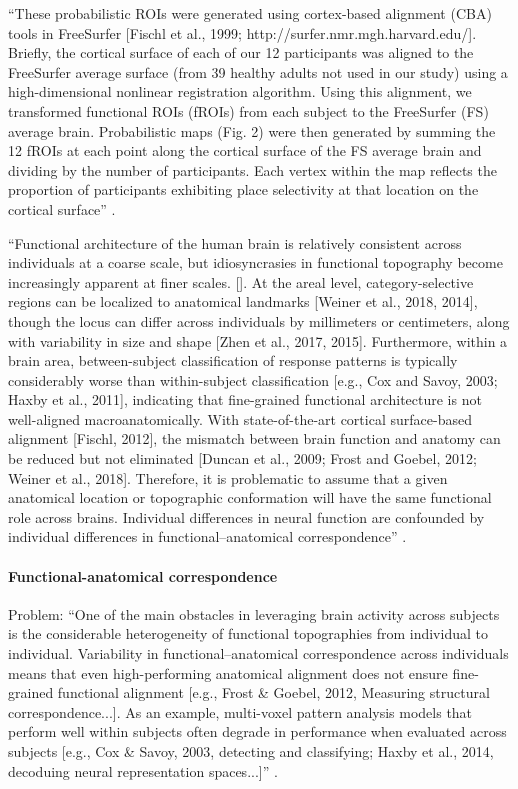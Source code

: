 %
``These probabilistic ROIs were generated using cortex-based alignment (CBA)
tools in FreeSurfer [Fischl et al., 1999; http://surfer.nmr.mgh.harvard.edu/].
Briefly, the cortical surface of each of our 12 participants was aligned to the
FreeSurfer average surface (from 39 healthy adults not used in our study) using
a high-dimensional nonlinear registration algorithm. Using this alignment, we
transformed functional ROIs (fROIs) from each subject to the FreeSurfer (FS)
average brain. Probabilistic maps (Fig. 2) were then generated by summing the 12
fROIs at each point along the cortical surface of the FS average brain and
dividing by the number of participants. Each vertex within the map reflects the
proportion of participants exhibiting place selectivity at that location on the
cortical surface'' \citep{weiner2018defining}.

``Functional architecture of the human brain is relatively consistent across
individuals at a coarse scale, but idiosyncrasies in functional topography
become increasingly apparent at finer scales. []. At the areal level,
category-selective regions can be localized to anatomical landmarks [Weiner et
al., 2018, 2014], though the locus can differ across individuals by millimeters
or centimeters, along with variability in size and shape [Zhen et al., 2017,
2015]. Furthermore, within a brain area, between-subject classification of
response patterns is typically considerably worse than within-subject
classification [e.g., Cox and Savoy, 2003; Haxby et al., 2011], indicating that
fine-grained functional architecture is not well-aligned macroanatomically. With
state-of-the-art cortical surface-based alignment [Fischl, 2012], the mismatch
between brain function and anatomy can be reduced but not eliminated [Duncan et
al., 2009; Frost and Goebel, 2012; Weiner et al., 2018]. Therefore, it is
problematic to assume that a given anatomical location or topographic
conformation will have the same functional role across brains. Individual
differences in neural function are confounded by individual differences in
functional–anatomical correspondence'' \citep{feilong2018reliable}.


\paragraph{Functional-anatomical correspondence}

Problem: ``One of the main obstacles in leveraging brain activity across
subjects is the considerable heterogeneity of functional topographies from
individual to individual. Variability in functional–anatomical correspondence
across individuals means that even high-performing anatomical alignment does not
ensure fine-grained functional alignment [e.g., Frost \& Goebel, 2012, Measuring
structural correspondence...]. As an example, multi-voxel
pattern analysis models that perform well within subjects often degrade in
performance when evaluated across subjects [e.g., Cox \& Savoy, 2003, detecting
and classifying; Haxby et al., 2014, decoduing neural representation spaces...]'' \citep{kumar2020brainiak}.

